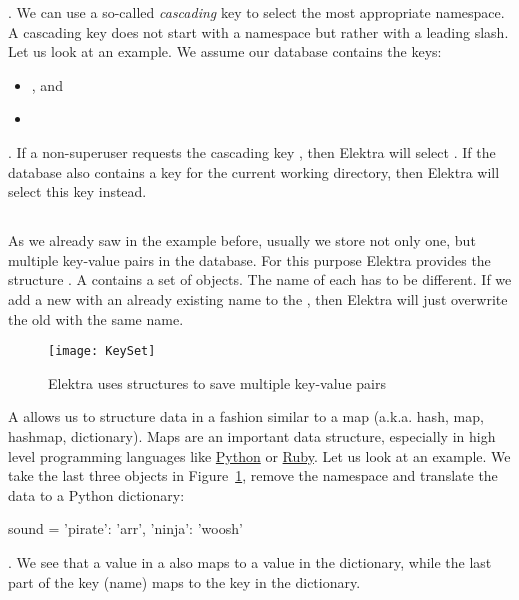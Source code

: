 . We can use a so-called \emph{cascading} key to select the most appropriate namespace. A cascading key does not start with a namespace but rather with a leading slash. Let us look at an example. We assume our database contains the keys:

\begin{itemize}
  \item {}, and
  \item {}
\end{itemize}

. If a non-superuser requests the cascading key , then Elektra will select . If the database also contains a key  for the current working directory, then Elektra will select this key instead.

\subsection{}
\label{sec:keyset}

As we already saw in the example before, usually we store not only one, but multiple key-value pairs in the database. For this purpose Elektra provides the structure . A  contains a set of  objects. The name of each  has to be different. If we add a new  with an already existing name to the , then Elektra will just overwrite the old  with the same name.

\begin{figure}
  \centering
    \texttt{[image: KeySet]}
  \caption{Elektra uses  structures to save multiple key-value pairs}
  \label{fig:keyset}
\end{figure}

A  allows us to structure data in a fashion similar to a map (a.k.a. hash, map, hashmap, dictionary). Maps are an important data structure, especially in high level programming languages like \href{https://www.python.org}{Python} or \href{https://www.ruby-lang.org}{Ruby}. Let us look at an example. We take the last three  objects in Figure~\ref{fig:keyset}, remove the namespace and translate the data to a Python dictionary:

\begin{pythoncode}
  sound = {'pirate': 'arr', 'ninja': 'woosh'}
\end{pythoncode}

. We see that a value in a  also maps to a value in the dictionary, while the last part of the key (name) maps to the key in the dictionary.

